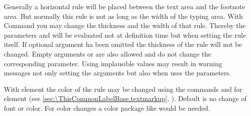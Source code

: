 \begin{Declaration}
\end{Declaration}%
Generally%
a horizontal rule will be placed between the text area and the footnote
area. But normally this rule is not as long as the width of the typing
area. With Command  you may change the thickness and
the width of that rule. Thereby the parameters  and
 will be evaluated not at definition time but when setting the
rule itself. If optional argument  ha been omitted the
thickness of the rule will not be changed. Empty arguments 
or  are also allowed and do not change the corresponding
parameter. Using implausible values may result in warning messages not only
setting the arguments but also when \KOMAScript{} uses the parameters.

\BeginIndexGroup
{}%
With element 
the color%
of the rule may be changed using the commands
 and
 for element
 (see \autoref{sec:\ThisCommonLabelBase.textmarkup},
). Default is no change of
font or color. For color changes a color package like
 would be
needed.%
%
\EndIndexGroup
\EndIndexGroup
%
\EndIndexGroup



